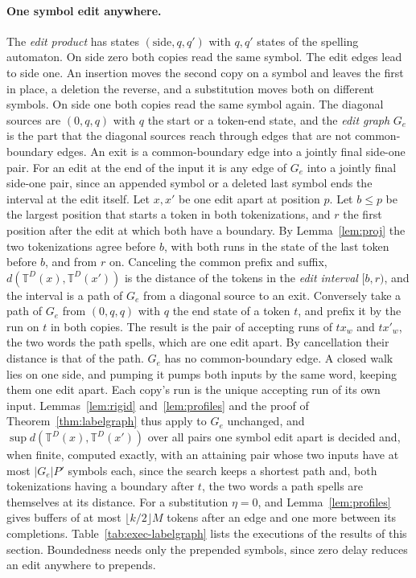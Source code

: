 \documentclass[11pt,a4paper]{article}
\theoremstyle{definition}
\theoremstyle{plain}
\newcommand{\T}{\mathbb{T}}
\begin{document}
\paragraph{One symbol edit anywhere.} The \emph{edit product} has states \((\text{side}, q, q')\) with \(q, q'\) states
of the spelling automaton. On side zero both copies read the same symbol. The edit edges lead to side one. An insertion
moves the second copy on a symbol and leaves the first in place, a deletion the reverse, and a substitution moves both
on different symbols. On side one both copies read the same symbol again. The diagonal sources are \((0, q, q)\) with
\(q\) the start or a token-end state, and the \emph{edit graph} \(G_e\) is the part that the diagonal sources reach
through edges that are not common-boundary edges. An exit is a common-boundary edge into a jointly final side-one pair.
For an edit at the end of the input it is any edge of \(G_e\) into a jointly final side-one pair, since an appended
symbol or a deleted last symbol ends the interval at the edit itself. Let \(x, x'\) be one edit apart at position \(p\).
Let \(b \le p\) be the largest position that starts a token in both tokenizations, and \(r\) the first position after
the edit at which both have a boundary. By Lemma~\ref{lem:proj} the two tokenizations agree before \(b\), with both runs
in the state of the last token before \(b\), and from \(r\) on. Canceling the common prefix and suffix,
\(d(\T^D(x), \T^D(x'))\) is the distance of the tokens in the \emph{edit interval} \([b, r)\), and the interval is a
path of \(G_e\) from a diagonal source to an exit. Conversely take a path of \(G_e\) from \((0, q, q)\) with \(q\) the
end state of a token \(t\), and prefix it by the run on \(t\) in both copies. The result is the pair of accepting runs
of \(t x_w\) and \(t x'_w\), the two words the path spells, which are one edit apart. By cancellation their distance is
that of the path. \(G_e\) has no common-boundary edge. A closed walk lies on one side, and pumping it pumps both inputs
by the same word, keeping them one edit apart. Each copy's run is the unique accepting run of its own input.
Lemmas~\ref{lem:rigid} and~\ref{lem:profiles} and the proof of Theorem~\ref{thm:labelgraph} thus apply to \(G_e\)
unchanged, and \(\sup d(\T^D(x), \T^D(x'))\) over all pairs one symbol edit apart is decided and, when finite, computed
exactly, with an attaining pair whose two inputs have at most \(|G_e| P'\) symbols each, since the search keeps a
shortest path and, both tokenizations having a boundary after \(t\), the two words a path spells are themselves at its
distance. For a substitution \(\eta = 0\), and Lemma~\ref{lem:profiles} gives buffers of at most
\(\lfloor k/2 \rfloor M\) tokens after an edge and one more between its completions. Table~\ref{tab:exec-labelgraph}
lists the executions of the results of this section. Boundedness needs only the prepended symbols, since zero delay
reduces an edit anywhere to prepends.
\end{document}
